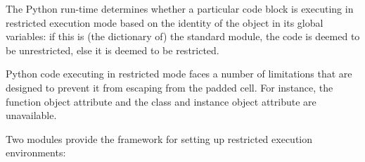 The Python run-time determines whether a particular code block is
executing in restricted execution mode based on the identity of the
 object in its global variables: if this is (the
dictionary of) the standard  module,
the code is deemed to be unrestricted, else it is deemed to be
restricted.

Python code executing in restricted mode faces a number of limitations
that are designed to prevent it from escaping from the padded cell.
For instance, the function object attribute  and
the class and instance object attribute  are
unavailable.

Two modules provide the framework for setting up restricted execution
environments:

\localmoduletable

\begin{seealso}

\end{seealso}
